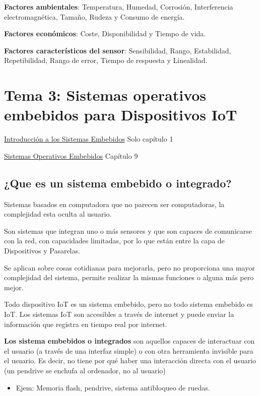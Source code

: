 \documentclass[12pt]{report} %
\begin{document}
\textbf{Factores ambientales}: Temperatura, Humedad, Corrosión,
Interferencia electromagnética, Tamaño, Rudeza y Consumo de energía.

\textbf{Factores económicos}: Coste, Disponibilidad y Tiempo de vida.

\textbf{Factores característicos del sensor}: Sensibilidad, Rango,
Estabilidad, Repetibilidad, Rango de error, Tiempo de respuesta y
Linealidad.

\chapter{Tema 3: Sistemas operativos embebidos para Dispositivos
IoT}

\href{https://aulaglobal.uc3m.es/mod/url/view.php?id=3123882}{Introducción
a los Sistemas Embebidos} Solo capítulo 1

\href{https://aulaglobal.uc3m.es/mod/url/view.php?id=3123883}{Sistemas
Operativos Embebidos} Capítulo 9

\section{¿Que es un sistema embebido o
integrado?}

Sistemas basados en computadora que no parecen ser computadoras, la complejidad esta oculta al usuario.

Son sistemas que integran uno o más sensores y que son capaces de
comunicarse con la red, con capacidades limitadas, por lo que están
entre la capa de Dispositivos y Pasarelas.

Se aplican sobre cosas cotidianas para mejorarla, pero no
proporciona una mayor complejidad del sistema, permite realizar la
mismas funciones o alguna más pero mejor.

Todo dispositivo IoT es un sistema embebido, pero no todo sistema
embebido es IoT. Los sistemas IoT son accesibles a través de internet y
puede enviar la información que registra en tiempo real por internet.

\textbf{Los sistema embebidos o integrados} son aquellos capaces de
interactuar con el usuario (a través de una interfaz simple) o con otra herramienta invisible para el usuario. Es decir, no tiene por qué haber una interacción directa con el usuario (un pendrive se enchufa al ordenador, no al usuario)

\begin{itemize}

\item
  Ejem: Memoria flash, pendrive, sistema antibloqueo de ruedas.
\end{itemize}
\end{document}
